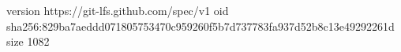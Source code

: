 version https://git-lfs.github.com/spec/v1
oid sha256:829ba7aeddd071805753470c959260f5b7d737783fa937d52b8c13e49292261d
size 1082
